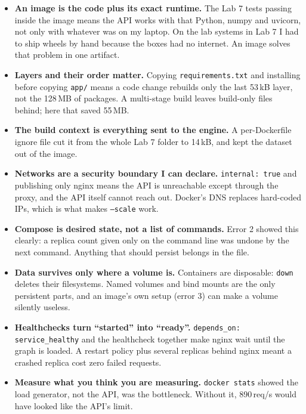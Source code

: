 \documentclass[11pt,a4paper]{article}
\begin{document}
\begin{itemize}
  \item \textbf{An image is the code plus its exact runtime.} The Lab 7 tests passing inside the image
    means the API works with that Python, numpy and uvicorn, not only with whatever was on my laptop.
    On the lab systems in Lab 7 I had to ship wheels by hand because the boxes had no internet. An
    image solves that problem in one artifact.
  \item \textbf{Layers and their order matter.} Copying \texttt{requirements.txt} and installing before
    copying \texttt{app/} means a code change rebuilds only the last 53\,kB layer, not the 128\,MB of
    packages. A multi-stage build leaves build-only files behind; here that saved 55\,MB.
  \item \textbf{The build context is everything sent to the engine.} A per-Dockerfile ignore file cut
    it from the whole Lab 7 folder to 14\,kB, and kept the dataset out of the image.
  \item \textbf{Networks are a security boundary I can declare.} \texttt{internal: true} and publishing
    only nginx means the API is unreachable except through the proxy, and the API itself cannot
    reach out. Docker's DNS replaces hard-coded IPs, which is what makes \texttt{--scale} work.
  \item \textbf{Compose is desired state, not a list of commands.} Error 2 showed this clearly: a
    replica count given only on the command line was undone by the next command. Anything that should
    persist belongs in the file.
  \item \textbf{Data survives only where a volume is.} Containers are disposable: \texttt{down}
    deletes their filesystems. Named volumes and bind mounts are the only persistent parts, and an
    image's own setup (error 3) can make a volume silently useless.
  \item \textbf{Healthchecks turn ``started'' into ``ready''.} \texttt{depends\_on: service\_healthy}
    and the healthcheck together make nginx wait until the graph is loaded. A restart policy plus
    several replicas behind nginx meant a crashed replica cost zero failed requests.
  \item \textbf{Measure what you think you are measuring.} \texttt{docker stats} showed the load
    generator, not the API, was the bottleneck. Without it, 890\,req/s would have looked like the
    API's limit.
\end{itemize}

\appendix
\end{document}
